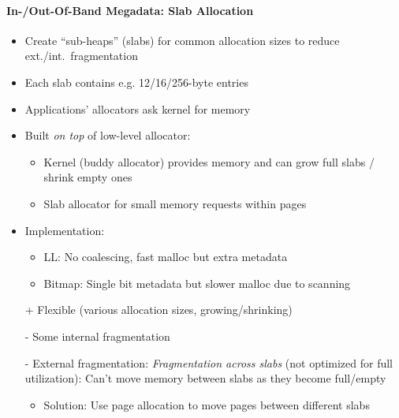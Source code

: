 \paragraph{In-/Out-Of-Band Megadata: Slab Allocation}

\begin{itemize}
    \item Create ``sub-heaps'' (slabs) for common allocation sizes to reduce ext./int.\ fragmentation
    \item Each slab contains e.g. 12/16/256-byte entries
    \item Applications' allocators ask kernel for memory
    \item Built \textit{on top} of low-level allocator:
    \begin{itemize}
        \item Kernel (buddy allocator) provides memory and can grow full slabs / shrink empty ones
        \item Slab allocator for small memory requests within pages
    \end{itemize}
    \item Implementation:
    \begin{itemize}
        \item LL: No coalescing, fast malloc but extra metadata
        \item Bitmap: Single bit metadata but slower malloc due to scanning
    \end{itemize}
\end{itemize}

\begin{itemize}
    \item[+] Flexible (various allocation sizes, growing/shrinking)
    \item[-] Some internal fragmentation
    \item[-] External fragmentation: \textit{Fragmentation across slabs} (not optimized for full utilization): Can't move memory between slabs as they become full/empty
    \begin{itemize}
        \item Solution: Use page allocation to move pages between different slabs
    \end{itemize}
\end{itemize}

